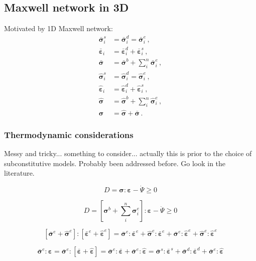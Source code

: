 \documentclass[12pt]{article}
\newcommand{\bsig}{\bar{\bm{\sigma}}}
\newcommand{\hsig}{\hat{\bm{\sigma}}}
\newcommand{\eps}{\bm{\varepsilon}}
\newcommand{\beps}{\bar{\bm{\varepsilon}}}
\newcommand{\heps}{\hat{\bm{\varepsilon}}}
\begin{document}
\subsection{Maxwell network in 3D}
Motivated by 1D Maxwell network:
\begin{align}
	\bar{\bm{\sigma}}^{s}_{i} &= \bar{\bm{\sigma}}^{d}_{i} = \bar{\bm{\sigma}}^{e}_{i}\,,\\
	\bar{\bm{\varepsilon}}_{i} &= \bar{\bm{\varepsilon}}^{d}_{i} + \bar{\bm{\varepsilon}}^{s}_{i}\,,\\
	\bar{\bm{\sigma}} & = \bar{\bm{\sigma}}^{b} + \sum_{i}^{n}\bar{\bm{\sigma}}^{e}_{i}\,,\\
	\hat{\bm{\sigma}}^{s}_{i} &= \hat{\bm{\sigma}}^{d}_{i} = \hat{\bm{\sigma}}^{e}_{i}\,,\\
	\hat{\bm{\varepsilon}}_{i} &= \hat{\bm{\varepsilon}}^{d}_{i} + \hat{\bm{\varepsilon}}^{s}_{i}\,,\\
	\hat{\bm{\sigma}} & = \hat{\bm{\sigma}}^{b} + \sum_{i}^{n}\hat{\bm{\sigma}}^{e}_{i}\,,\\
	\bm{\sigma} &=\hat{\bm{\sigma}} +\bar{\bm{\sigma}}\,.
\end{align}

\subsubsection{Thermodynamic considerations}
{\color{red} Messy and tricky... something to consider... actually this is prior to the choice of subconstitutive models. Probably been addressed before. Go look in the literature.}

\begin{equation}
	D = \bm{\sigma}:\bm{\varepsilon} - \dot{\Psi} \geq 0
\end{equation}

\begin{equation}
	D = \left[\bm{\sigma}^{b} + \sum_{i}^{n}\bm{\sigma}^{e}_{i}\right] :\bm{\varepsilon} - \dot{\Psi} \geq 0
\end{equation}

\begin{equation}
	\left[\bsig^{e} + \hsig^{e}\right] : \left[\beps^{e} + \heps^{e}\right] = \bsig^{e}:\beps^{e} + \hsig^{e}:\beps^{e} + \bsig^{e} : \heps^{e} + \hsig^{e}: \heps^{e}
\end{equation}

\begin{equation}
	\bsig^{e}:\eps = \bsig^{e}:\left[\beps + \heps\right] = \bsig^{e}:\beps + \bsig^{e}:\heps = \bsig^{s}:\beps^{s} + \bsig^{d}:\beps^{d} + \bsig^{e}:\heps
\end{equation}
\end{document}
